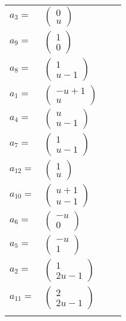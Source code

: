 \documentclass[1p]{elsarticle_modified}
\theoremstyle{definition}
\begin{document}
\begin{tabular}{m{7pt} m{180pt} m{7pt} m{180pt} }
\flushright $a_{3}=$&$\begin{pmatrix}0\\u\end{pmatrix}$ \\
\flushright $a_{9}=$&$\begin{pmatrix}1\\0\end{pmatrix}$ \\
\flushright $a_{8}=$&$\begin{pmatrix}1\\u-1\end{pmatrix}$ \\
\flushright $a_{1}=$&$\begin{pmatrix}- u+1\\u\end{pmatrix}$ \\
\flushright $a_{4}=$&$\begin{pmatrix}u\\u-1\end{pmatrix}$ \\
\flushright $a_{7}=$&$\begin{pmatrix}1\\u-1\end{pmatrix}$ \\
\flushright $a_{12}=$&$\begin{pmatrix}1\\u\end{pmatrix}$ \\
\flushright $a_{10}=$&$\begin{pmatrix}u+1\\u-1\end{pmatrix}$ \\
\flushright $a_{6}=$&$\begin{pmatrix}- u\\0\end{pmatrix}$ \\
\flushright $a_{5}=$&$\begin{pmatrix}- u\\1\end{pmatrix}$ \\
\flushright $a_{2}=$&$\begin{pmatrix}1\\2 u-1\end{pmatrix}$ \\
\flushright $a_{11}=$&$\begin{pmatrix}2\\2 u-1\end{pmatrix}$\\&\end{tabular}
\end{document}

